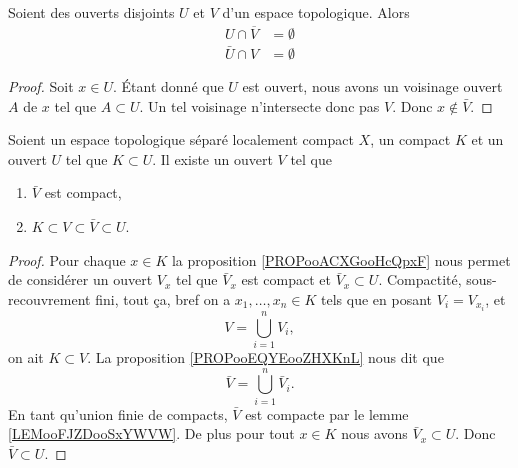 \begin{proposition}	\label{PROPooAXUEooQxRGmr}
	Soient des ouverts disjoints \( U\) et \( V\) d'un espace topologique. Alors
	\begin{subequations}
		\begin{align}
			U\cap\overline{ V} & = \emptyset \\
			\bar U\cap V       & = \emptyset
		\end{align}
	\end{subequations}
\end{proposition}

\begin{proof}
	Soit \( x\in U\). Étant donné que \( U\) est ouvert, nous avons un voisinage ouvert \( A\) de \( x\) tel que \( A\subset U\). Un tel voisinage n'intersecte donc pas \( V\). Donc \( x\not\in \bar V\).
\end{proof}

\begin{lemma}       \label{LEMooKYMKooPxZjWN}
	Soient un espace topologique séparé localement compact \( X\), un compact \( K\) et un ouvert \( U\) tel que \( K\subset U\). Il existe un ouvert \( V\) tel que
	\begin{enumerate}
		\item
		      \( \bar V\) est compact,
		\item
		      \( K\subset V\subset\bar V\subset U\).
	\end{enumerate}
\end{lemma}

\begin{proof}
	Pour chaque \( x\in K\) la proposition \ref{PROPooACXGooHcQpxF} nous permet de considérer un ouvert \( V_x\) tel que \( \bar V_x\) est compact et \( \bar V_x\subset U\). Compactité, sous-recouvrement fini, tout ça, bref on a \( x_1,\ldots,x_n\in K\) tels que en posant \( V_i=V_{x_i}\), et
	\begin{equation}
		V=\bigcup_{i=1}^nV_i,
	\end{equation}
	on ait \( K\subset V\). La proposition \ref{PROPooEQYEooZHXKnL} nous dit que
	\begin{equation}
		\bar V=\bigcup_{i=1}^n\bar V_i.
	\end{equation}
	En tant qu'union finie de compacts, \( \bar V\) est compacte par le lemme \ref{LEMooFJZDooSxYWVW}. De plus pour tout \( x\in K\) nous avons \( \bar V_x\subset U\). Donc \( \bar V\subset U\).
\end{proof}


